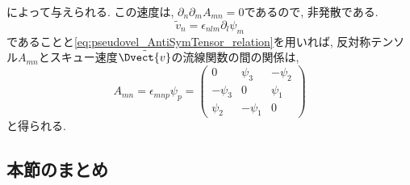 によって与えられる. 
この速度は, $\partial_n \partial_m A_{mn}=0$であるので, 非発散である. 
\begin{equation}
  \tilde{v}_n = \epsilon_{nlm} \partial_l \psi_m
\end{equation}
であることと\eqref{eq:pseudovel_AntiSymTensor_relation}を用いれば, 
反対称テンソル$A_{mn}$とスキュー速度$\tilde{\Dvect{v}}$の流線関数の間の関係は, 
\begin{equation}
  A_{mn} = \epsilon_{mnp} \psi_p =
\begin{pmatrix}
 0 &\psi_3 &-\psi_2 \\
 -\psi_3 &0 &\psi_1 \\
 \psi_2  &-\psi_1 &0
\end{pmatrix}
\label{eq:AntiSymTensor_Psi_relation}
\end{equation}
と得られる. 

\subsection{本節のまとめ}

